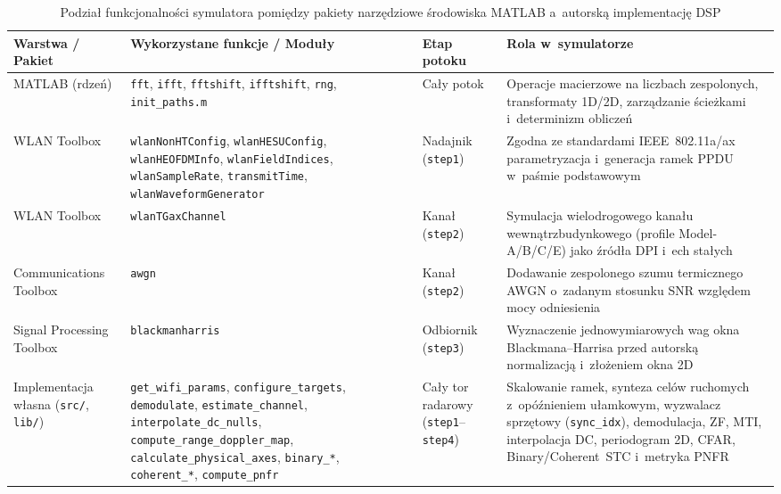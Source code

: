 \begin{table}[H]
    \centering
    \linespread{1.05}\selectfont
    \caption{Podział funkcjonalności symulatora pomiędzy pakiety narzędziowe środowiska MATLAB a~autorską implementację DSP}
    \label{tab:toolboxes_vs_custom}
    \footnotesize
    \begin{tabular}{|p{2.6cm}|p{4.8cm}|p{2.1cm}|p{4.9cm}|}
        \hline
        \textbf{Warstwa / Pakiet} & \textbf{Wykorzystane funkcje / Moduły} & \textbf{Etap potoku} & \textbf{Rola w~symulatorze} \\
        \hline
        MATLAB (rdzeń) & \texttt{fft}, \texttt{ifft}, \texttt{fftshift}, \texttt{ifftshift}, \texttt{rng}, \texttt{init\_paths.m} & Cały potok & Operacje macierzowe na liczbach zespolonych, transformaty 1D/2D, zarządzanie ścieżkami i~determinizm obliczeń \\
        \hline
        WLAN Toolbox & \texttt{wlanNonHTConfig}, \texttt{wlanHESUConfig}, \texttt{wlanHEOFDMInfo}, \texttt{wlanFieldIndices}, \texttt{wlanSampleRate}, \texttt{transmitTime}, \texttt{wlanWaveform\-Generator} & Nadajnik (\texttt{step1}) & Zgodna ze standardami IEEE~802.11a/ax parametryzacja i~generacja ramek PPDU w~paśmie podstawowym \\
        \hline
        WLAN Toolbox & \texttt{wlanTGaxChannel} & Kanał (\texttt{step2}) & Symulacja wielodrogowego kanału wewnątrzbudynkowego (profile Model-A/B/C/E) jako źródła DPI i~ech stałych \\
        \hline
        Communications Toolbox & \texttt{awgn} & Kanał (\texttt{step2}) & Dodawanie zespolonego szumu termicznego AWGN o~zadanym stosunku SNR względem mocy odniesienia \\
        \hline
        Signal Processing Toolbox & \texttt{blackmanharris} & Odbiornik (\texttt{step3}) & Wyznaczenie jednowymiarowych wag okna Blackmana--Harrisa przed autorską normalizacją i~złożeniem okna 2D \\
        \hline
        Implementacja własna (\texttt{src/}, \texttt{lib/}) & \texttt{get\_wifi\_params}, \texttt{configure\_targets}, \texttt{demodulate}, \texttt{estimate\_channel}, \texttt{interpolate\_\allowbreak dc\_nulls}, \texttt{compute\_\allowbreak range\_\allowbreak doppler\_map}, \texttt{calculate\_\allowbreak physical\_axes}, \texttt{binary\_*}, \texttt{coherent\_*}, \texttt{compute\_pnfr} & Cały tor radarowy (\texttt{step1}--\texttt{step4}) & Skalowanie ramek, synteza celów ruchomych z~opóźnieniem ułamkowym, wyzwalacz sprzętowy (\texttt{sync\_idx}), demodulacja, ZF, MTI, interpolacja DC, periodogram 2D, CFAR, Binary/Coherent~STC i~metryka PNFR \\
        \hline
    \end{tabular}
\end{table}
